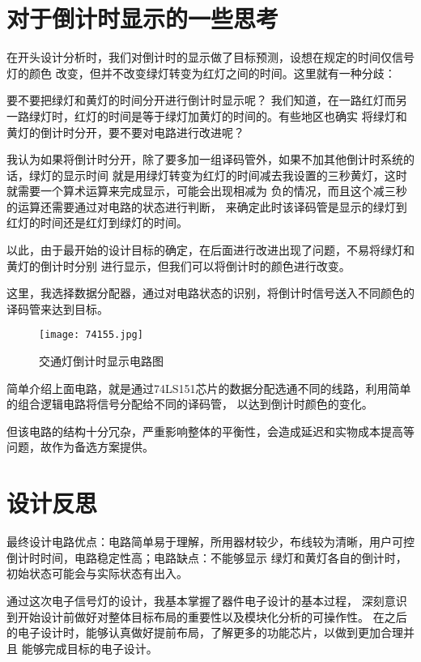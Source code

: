 \documentclass[AutoFakeBold]{LZUThesis}
\begin{document}
\section{对于倒计时显示的一些思考}
在开头设计分析时，我们对倒计时的显示做了目标预测，设想在规定的时间仅信号灯的颜色
改变，但并不改变绿灯转变为红灯之间的时间。这里就有一种分歧：

要不要把绿灯和黄灯的时间分开进行倒计时显示呢？
我们知道，在一路红灯而另一路绿灯时，红灯的时间是等于绿灯加黄灯的时间的。有些地区也确实
将绿灯和黄灯的倒计时分开，要不要对电路进行改进呢？

我认为如果将倒计时分开，除了要多加一组译码管外，如果不加其他倒计时系统的话，绿灯的显示时间
就是用绿灯转变为红灯的时间减去我设置的三秒黄灯，这时就需要一个算术运算来完成显示，可能会出现相减为
负的情况，而且这个减三秒的运算还需要通过对电路的状态进行判断，
来确定此时该译码管是显示的绿灯到红灯的时间还是红灯到绿灯的时间。

以此，由于最开始的设计目标的确定，在后面进行改进出现了问题，不易将绿灯和黄灯的倒计时分别
进行显示，但我们可以将倒计时的颜色进行改变。

这里，我选择数据分配器，通过对电路状态的识别，将倒计时信号送入不同颜色的译码管来达到目标。

\begin{figure}[htbp]
    \centering
    \texttt{[image: 74155.jpg]}
    \caption{交通灯倒计时显示电路图}
\end{figure}

简单介绍上面电路，就是通过74LS151芯片的数据分配选通不同的线路，利用简单的组合逻辑电路将信号分配给不同的译码管，
以达到倒计时颜色的变化。

但该电路的结构十分冗杂，严重影响整体的平衡性，会造成延迟和实物成本提高等问题，故作为备选方案提供。
\section{设计反思}
最终设计电路优点：电路简单易于理解，所用器材较少，布线较为清晰，用户可控倒计时时间，电路稳定性高；电路缺点：不能够显示
绿灯和黄灯各自的倒计时，初始状态可能会与实际状态有出入。

通过这次电子信号灯的设计，我基本掌握了器件电子设计的基本过程，
深刻意识到开始设计前做好对整体目标布局的重要性以及模块化分析的可操作性。
在之后的电子设计时，能够认真做好提前布局，了解更多的功能芯片，以做到更加合理并且
能够完成目标的电子设计。
\backmatter


\printbib
\nocite{*} %




\end{document}
